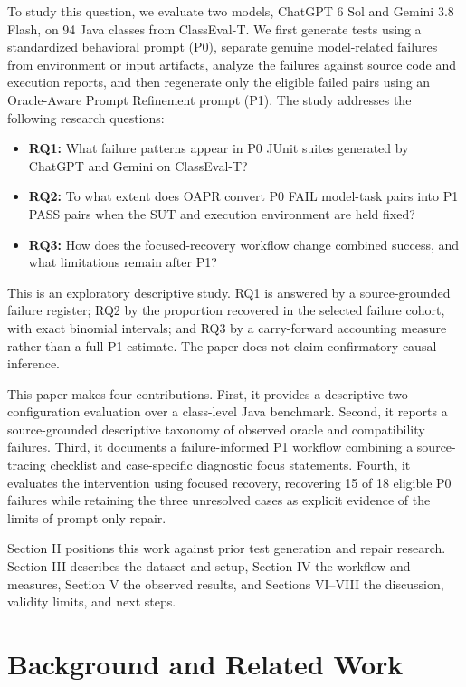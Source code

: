 \documentclass[conference]{IEEEtran}
\begin{document}
To study this question, we evaluate two models, ChatGPT 6 Sol and Gemini 3.8 Flash, on 94 Java classes from ClassEval-T. We first generate tests using a standardized behavioral prompt (P0), separate genuine model-related failures from environment or input artifacts, analyze the failures against source code and execution reports, and then regenerate only the eligible failed pairs using an Oracle-Aware Prompt Refinement prompt (P1). The study addresses the following research questions:

\begin{itemize}[leftmargin=*,nosep]
    \item \textbf{RQ1:} What failure patterns appear in P0 JUnit suites generated by ChatGPT and Gemini on ClassEval-T?
    \item \textbf{RQ2:} To what extent does OAPR convert P0 FAIL model-task pairs into P1 PASS pairs when the SUT and execution environment are held fixed?
    \item \textbf{RQ3:} How does the focused-recovery workflow change combined success, and what limitations remain after P1?
\end{itemize}

This is an exploratory descriptive study. RQ1 is answered by a source-grounded failure register; RQ2 by the proportion recovered in the selected failure cohort, with exact binomial intervals; and RQ3 by a carry-forward accounting measure rather than a full-P1 estimate. The paper does not claim confirmatory causal inference.

This paper makes four contributions. First, it provides a descriptive two-configuration evaluation over a class-level Java benchmark. Second, it reports a source-grounded descriptive taxonomy of observed oracle and compatibility failures. Third, it documents a failure-informed P1 workflow combining a source-tracing checklist and case-specific diagnostic focus statements. Fourth, it evaluates the intervention using focused recovery, recovering 15 of 18 eligible P0 failures while retaining the three unresolved cases as explicit evidence of the limits of prompt-only repair.

Section II positions this work against prior test generation and repair research. Section III describes the dataset and setup, Section IV the workflow and measures, Section V the observed results, and Sections VI--VIII the discussion, validity limits, and next steps.

\section{Background and Related Work}
\end{document}
